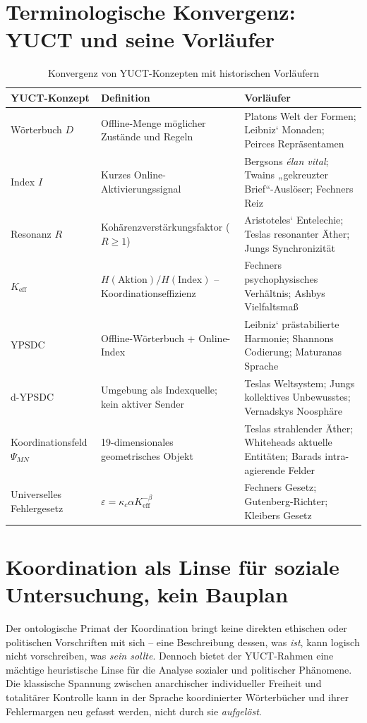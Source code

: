 \documentclass[12pt,a4paper]{article}
\begin{document}
	\section{Terminologische Konvergenz: YUCT und seine Vorläufer}
	
	\begin{table}[htbp]
		\centering
		\caption{Konvergenz von YUCT-Konzepten mit historischen Vorläufern}
		\label{tab:convergence}
		\small
		\begin{tabular}{p{2.5cm}p{4.5cm}p{4.5cm}}
			\toprule
			\textbf{YUCT-Konzept} & \textbf{Definition} & \textbf{Vorläufer} \\
			\midrule
			Wörterbuch \(D\) & Offline-Menge möglicher Zustände und Regeln & Platons Welt der Formen; Leibniz‘ Monaden; Peirces Repräsentamen \\
			Index \(I\) & Kurzes Online-Aktivierungssignal & Bergsons \emph{élan vital}; Twains „gekreuzter Brief“-Auslöser; Fechners Reiz \\
			Resonanz \(R\) & Kohärenzverstärkungsfaktor (\(R \ge 1\)) & Aristoteles‘ Entelechie; Teslas resonanter Äther; Jungs Synchronizität \\
			\(K_{\mathrm{eff}}\) & \(H(\text{Aktion})/H(\text{Index})\) – Koordinationseffizienz & Fechners psychophysisches Verhältnis; Ashbys Vielfaltsmaß \\
			YPSDC & Offline-Wörterbuch + Online-Index & Leibniz‘ prästabilierte Harmonie; Shannons Codierung; Maturanas Sprache \\
			d-YPSDC & Umgebung als Indexquelle; kein aktiver Sender & Teslas Weltsystem; Jungs kollektives Unbewusstes; Vernadskys Noosphäre \\
			Koordinationsfeld \(\Psi_{MN}\) & 19-dimensionales geometrisches Objekt & Teslas strahlender Äther; Whiteheads aktuelle Entitäten; Barads intra-agierende Felder \\
			Universelles Fehlergesetz & \(\varepsilon = \kappa_c \alpha K_{\mathrm{eff}}^{-\beta}\) & Fechners Gesetz; Gutenberg-Richter; Kleibers Gesetz \\
			\bottomrule
		\end{tabular}
	\end{table}
	
	\section{Koordination als Linse für soziale Untersuchung, kein Bauplan}
	\label{sec:social-lens}
	
	Der ontologische Primat der Koordination bringt keine direkten ethischen oder politischen Vorschriften mit sich – eine Beschreibung dessen, was \emph{ist}, kann logisch nicht vorschreiben, was \emph{sein sollte}. Dennoch bietet der YUCT-Rahmen eine mächtige heuristische Linse für die Analyse sozialer und politischer Phänomene. Die klassische Spannung zwischen anarchischer individueller Freiheit und totalitärer Kontrolle kann in der Sprache koordinierter Wörterbücher und ihrer Fehlermargen neu gefasst werden, nicht durch sie \emph{aufgelöst}.
	
\end{document}
